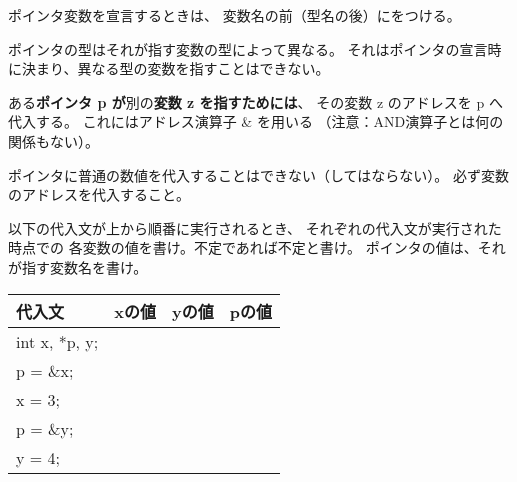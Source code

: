 \documentclass[12pt,a4j]{jarticle}
\newcounter{toi}
\def\toi{%
\bigskip\bigskip\noindent
\addtocounter{toi}{1}
\shadowbox{\bfseries\large 問\thetoi}
\nopagebreak[4]\bigskip\nopagebreak[4]
}
\begin{document}
ポインタ変数を宣言するときは、
変数名の前（型名の後）に{\ttfamily *}をつける。

ポインタの型はそれが指す変数の型によって異なる。
それはポインタの宣言時に決まり、異なる型の変数を指すことはできない。




\toi

ある{\bfseries ポインタ {\ttfamily p} が}別の{\bfseries 変数 {\ttfamily z} を指すためには}、
その変数 {\ttfamily z} のアドレスを {\ttfamily p} へ代入する。
これにはアドレス演算子 {\ttfamily \&} を用いる
（注意：AND演算子とは何の関係もない）。


ポインタに普通の数値を代入することはできない（してはならない）。
必ず変数のアドレスを代入すること。




以下の代入文が上から順番に実行されるとき、
それぞれの代入文が実行された時点での
各変数の値を書け。不定であれば不定と書け。
ポインタの値は、それが指す変数名を書け。

\begin{center} \ttfamily
 \begin{tabular}{|l|c|c|c|}\hline
  代入文 & xの値 & yの値 & pの値\\ \hline\hline
  int x, *p, y; & & & \\  \cline{2-4}
  p = \&x; & & & \\  \cline{2-4}
  x = 3;   & & & \\  \cline{2-4}
  p = \&y; & & & \\  \cline{2-4}
  y = 4;   & & & \\  \hline
 \end{tabular}
\end{center}
\end{document}
